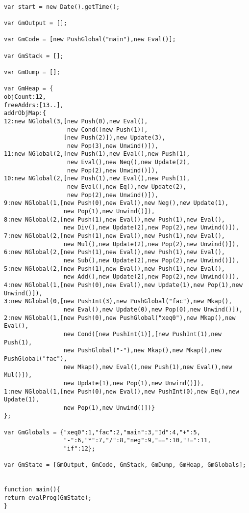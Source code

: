 \begin{verbatim}

var start = new Date().getTime();

var GmOutput = [];

var GmCode = [new PushGlobal("main"),new Eval()];

var GmStack = [];

var GmDump = [];

var GmHeap = {
objCount:12,
freeAddrs:[13..],
addrObjMap:{
12:new NGlobal(3,[new Push(0),new Eval(),
			      new Cond([new Push(1)],
			     [new Push(2)]),new Update(3),
			      new Pop(3),new Unwind()]),
11:new NGlobal(2,[new Push(1),new Eval(),new Push(1),
				  new Eval(),new Neq(),new Update(2),
				  new Pop(2),new Unwind()]),
10:new NGlobal(2,[new Push(1),new Eval(),new Push(1),
				  new Eval(),new Eq(),new Update(2),
				  new Pop(2),new Unwind()]),
9:new NGlobal(1,[new Push(0),new Eval(),new Neg(),new Update(1),
				 new Pop(1),new Unwind()]),
8:new NGlobal(2,[new Push(1),new Eval(),new Push(1),new Eval(),
	  			 new Div(),new Update(2),new Pop(2),new Unwind()]),
7:new NGlobal(2,[new Push(1),new Eval(),new Push(1),new Eval(),
				 new Mul(),new Update(2),new Pop(2),new Unwind()]),
6:new NGlobal(2,[new Push(1),new Eval(),new Push(1),new Eval(),
				 new Sub(),new Update(2),new Pop(2),new Unwind()]),
5:new NGlobal(2,[new Push(1),new Eval(),new Push(1),new Eval(),
			     new Add(),new Update(2),new Pop(2),new Unwind()]),
4:new NGlobal(1,[new Push(0),new Eval(),new Update(1),new Pop(1),new Unwind()]),
3:new NGlobal(0,[new PushInt(3),new PushGlobal("fac"),new Mkap(),
				 new Eval(),new Update(0),new Pop(0),new Unwind()]),
2:new NGlobal(1,[new Push(0),new PushGlobal("xeq0"),new Mkap(),new Eval(),
				 new Cond([new PushInt(1)],[new PushInt(1),new Push(1),
				 new PushGlobal("-"),new Mkap(),new Mkap(),new PushGlobal("fac"),
				 new Mkap(),new Eval(),new Push(1),new Eval(),new Mul()]),
				 new Update(1),new Pop(1),new Unwind()]),
1:new NGlobal(1,[new Push(0),new Eval(),new PushInt(0),new Eq(),new Update(1),
				 new Pop(1),new Unwind()])}
};

var GmGlobals = {"xeq0":1,"fac":2,"main":3,"Id":4,"+":5,
				 "-":6,"*":7,"/":8,"neg":9,"==":10,"!=":11,
				 "if":12};

var GmState = [GmOutput, GmCode, GmStack, GmDump, GmHeap, GmGlobals]; 	


function main(){
return evalProg(GmState);
}

\end{verbatim}

